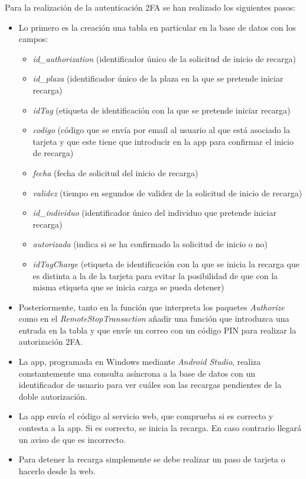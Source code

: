 \documentclass[12pt,a4paper,onecolumn,oneside]{report}
\begin{document}
Para la realización de la autenticación 2FA se han realizado los siguientes pasos:
\begin{itemize}
\item Lo primero es la creación una tabla en particular en la base de datos con los campos:
\begin{itemize}
\item \textit{id\_authorization} (identificador único de la solicitud de inicio de recarga)
\item \textit{id\_plaza} (identificador único de la plaza en la que se pretende iniciar recarga)
\item \textit{idTag} (etiqueta de identificación con la que se pretende iniciar recarga)
\item \textit{codigo} (código que se envía por email al usuario al que está asociado la tarjeta y que este tiene que introducir en la app para confirmar el inicio de recarga)
\item \textit{fecha} (fecha de solicitud del inicio de recarga)
\item \textit{validez} (tiempo en segundos de validez de la solicitud de inicio de recarga)
\item \textit{id\_individuo} (identificador único del individuo que pretende iniciar recarga)
\item \textit{autorizada} (indica si se ha confirmado la solicitud de inicio o no)
\item \textit{idTagCharge} (etiqueta de identificación con la que se inicia la recarga que es distinta a la de la tarjeta para evitar la posibilidad de que con la misma etiqueta que se inicia carga se pueda detener)
\end{itemize}
\item Posteriormente, tanto en la función que interpreta los paquetes \textit{Authorize} como en el \textit{RemoteStopTransaction} añadir una función que introduzca una entrada en la tabla y que envíe un correo con un código PIN para realizar la autorización 2FA.
\item La app, programada en Windows mediante \textit{Android Studio}, realiza constantemente una consulta asíncrona a la base de datos con un identificador de usuario para ver cuáles son las recargas pendientes de la doble autorización.
\item La app envía el código al servicio web, que comprueba si es correcto y contesta a la app. Si es correcto, se inicia la recarga. En caso contrario llegará un aviso de que es incorrecto.
\item Para detener la recarga simplemente se debe realizar un paso de tarjeta o hacerlo desde la web.
\end{itemize}
\end{document}
